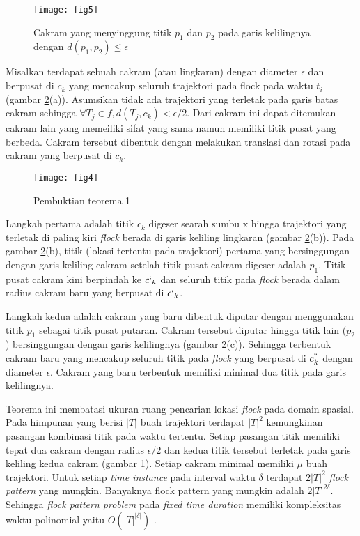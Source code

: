 \begin{figure}[H]
	\centering  
	\texttt{[image: fig5]}  
	\caption{Cakram yang menyinggung titik $p_1$ dan $p_2$ pada garis kelilingnya dengan $d(p_1,p_2)\leq\epsilon$} 
	\label{fig:theorem1} 
\end{figure}

\par Misalkan terdapat sebuah cakram (atau lingkaran) dengan diameter $\epsilon$ dan berpusat di $c_k$ yang mencakup seluruh trajektori pada flock pada waktu $t_i$ (gambar \ref{fig:proof}(a)). Asumsikan tidak ada trajektori yang terletak pada garis batas cakram sehingga $\forall T_j \in f, d(T_j ,c_k) < \epsilon/2$. Dari cakram ini dapat ditemukan cakram lain yang memeiliki sifat yang sama namun memiliki titik pusat yang berbeda. Cakram tersebut dibentuk dengan melakukan translasi dan rotasi pada cakram yang berpusat di $c_k$. 

\begin{figure}[H]
	\centering  
	\texttt{[image: fig4]}  
	\caption{Pembuktian teorema 1} 
	\label{fig:proof} 
\end{figure}

\par Langkah pertama adalah titik $c_k$ digeser searah sumbu x hingga trajektori yang terletak di paling kiri \textit{flock} berada di garis keliling lingkaran (gambar \ref{fig:proof}(b)). Pada gambar \ref{fig:proof}(b), titik (lokasi tertentu pada trajektori) pertama yang bersinggungan dengan garis keliling cakram setelah titik pusat cakram digeser adalah $p_1$. Titik pusat cakram kini berpindah ke $c`_k$ dan seluruh titik pada \textit{flock} berada dalam radius cakram baru yang berpusat di $c`_k$.

\par Langkah kedua adalah cakram yang baru dibentuk diputar dengan menggunakan titik $p_1$ sebagai titik pusat putaran. Cakram tersebut diputar hingga titik lain ($p_2$) bersinggungan dengan garis kelilingnya (gambar \ref{fig:proof}(c)). Sehingga terbentuk cakram baru yang mencakup seluruh titik pada \textit{flock} yang berpusat di $c^{``}_k$ dengan diameter $\epsilon$. Cakram yang baru terbentuk memiliki minimal dua titik pada garis kelilingnya.

\par Teorema ini membatasi ukuran ruang pencarian lokasi \textit{flock} pada domain spasial. Pada himpunan yang berisi $|T|$ buah trajektori terdapat $|T|^2$ kemungkinan pasangan kombinasi titik pada waktu tertentu. Setiap pasangan titik memiliki tepat dua cakram dengan radius $\epsilon/2$ dan kedua titik tersebut terletak pada garis keliling kedua cakram (gambar \ref{fig:theorem1}). Setiap cakram minimal memiliki $\mu$ buah trajektori. Untuk setiap \textit{time instance} pada interval waktu $\delta$ terdapat $2|T|^2$ \textit{flock pattern} yang mungkin. Banyaknya flock pattern yang mungkin adalah $2|T|^{2\delta}$. Sehingga \textit{flock pattern problem} pada \textit{fixed time duration} memiliki kompleksitas waktu polinomial yaitu $O(|T|^{|\delta|})$ \cite{flock_pattern_discovery_2:09}.

